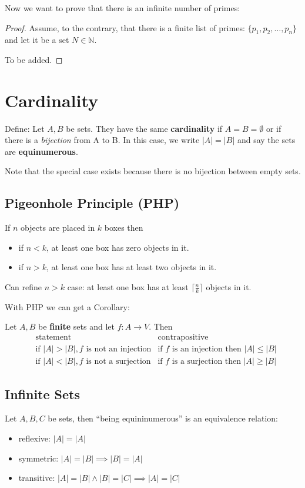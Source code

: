 \documentclass[letterpaper,12pt]{article}
\begin{document}
Now we want to prove that there is an infinite number of primes:
\begin{proof}
    Assume, to the contrary, that there is a finite list of primes: $\{p_1,p_2,\ldots, p_n\}$ and let it be a set $N\in \mathbb{N}$.
    
    To be added.
\end{proof}

\section{Cardinality}
Define: Let $A, B$ be sets. They have the same \textbf{cardinality} if $A=B=\emptyset$ or if there is a \textit{bijection} from A to B. In this case, we write $|A|=|B|$ and say the sets are \textbf{equinumerous}. 

Note that the special case exists because there is no bijection between empty sets. 
\subsection{Pigeonhole Principle (PHP)}
If $n$ objects are placed in $k$ boxes then\begin{itemize}
    \item if $n<k$, at least one box has zero objects in it.
    \item if $n>k$, at least one box has at least two objects in it.
\end{itemize}
Can refine $n>k$ case: at least one box has at least $\lceil \frac{n}{k} \rceil$ objects in it. 

With PHP we can get a Corollary:

Let $A,B$ be \textbf{finite} sets and let $f:A\to V$. Then\begin{align*}
&\text{statement} &\text{contrapositive}\\
&\text{if } |A|>|B|,f\text{ is not an injection} & \text{if } f \text{ is an injection then }|A|\le |B|\\
&\text{if } |A|<|B|,f\text{ is not a surjection} & \text{if } f \text{ is a surjection then }|A|\ge |B|
\end{align*}


\subsection{Infinite Sets}
Let $A, B ,C$ be sets, then ``being equininumerous'' is an equivalence relation:\begin{itemize}
    \item reflexive: $|A|=|A|$
    \item symmetric: $|A|=|B|\implies |B|=|A|$
    \item transitive: $|A|=|B|\land |B|=|C|\implies |A|=|C|$
\end{itemize}
\end{document}
